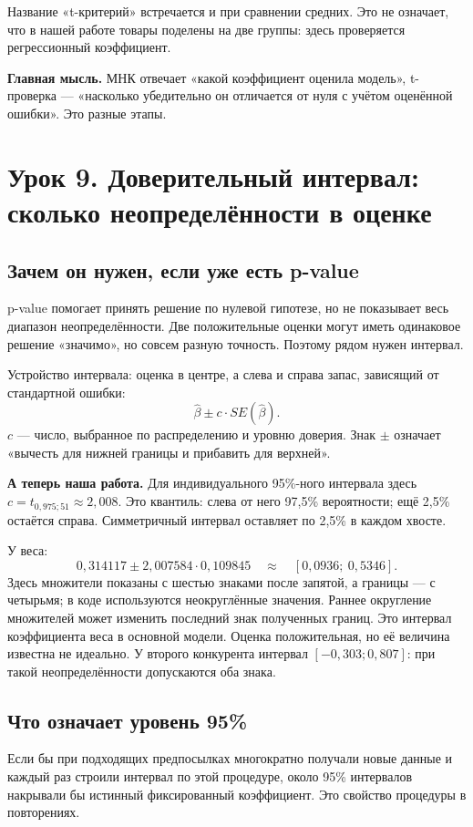 \documentclass[12pt,a4paper]{article}
\newcommand{\idea}[1]{\par\textbf{Главная мысль.} #1\par}
\newcommand{\ours}[1]{\par\textbf{А теперь наша работа.} #1\par}
\begin{document}
Название «t-критерий» встречается и при сравнении средних. Это не означает, что в нашей работе товары поделены на две группы: здесь проверяется регрессионный коэффициент.

\idea{МНК отвечает «какой коэффициент оценила модель», t-проверка --- «насколько убедительно он отличается от нуля с учётом оценённой ошибки». Это разные этапы.}

\section{Урок 9. Доверительный интервал: сколько неопределённости в оценке}

\subsection{Зачем он нужен, если уже есть p-value}

p-value помогает принять решение по нулевой гипотезе, но не показывает весь диапазон неопределённости. Две положительные оценки могут иметь одинаковое решение «значимо», но совсем разную точность. Поэтому рядом нужен интервал.

Устройство интервала: оценка в центре, а слева и справа запас, зависящий от стандартной ошибки:
\[
 \widehat\beta\pm c\cdot SE(\widehat\beta).
\]
$c$ --- число, выбранное по распределению и уровню доверия. Знак $\pm$ означает «вычесть для нижней границы и прибавить для верхней».

\ours{Для индивидуального 95\%-ного интервала здесь $c=t_{0{,}975;51}\approx2{,}008$. Это квантиль: слева от него 97,5\% вероятности; ещё 2,5\% остаётся справа. Симметричный интервал оставляет по 2,5\% в каждом хвосте.}

У веса:
\[
 0{,}314117\pm2{,}007584\cdot0{,}109845
 \quad\approx\quad [0{,}0936;\ 0{,}5346].
\]
Здесь множители показаны с шестью знаками после запятой, а границы --- с четырьмя; в коде используются неокруглённые значения. Раннее округление множителей может изменить последний знак полученных границ. Это интервал коэффициента веса в основной модели. Оценка положительная, но её величина известна не идеально. У второго конкурента интервал $[-0{,}303;0{,}807]$: при такой неопределённости допускаются оба знака.

\subsection{Что означает уровень 95\%}

Если бы при подходящих предпосылках многократно получали новые данные и каждый раз строили интервал по этой процедуре, около 95\% интервалов накрывали бы истинный фиксированный коэффициент. Это свойство процедуры в повторениях.
\end{document}
